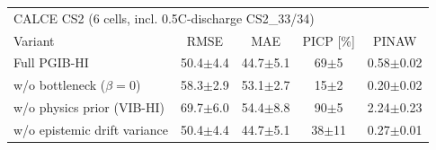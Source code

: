 \begin{tabular}{l c c c c}
\hline
\multicolumn{5}{l}{CALCE CS2 (6 cells, incl. 0.5C-discharge CS2\_33/34)}\\
 Variant & RMSE & MAE & PICP [\%] & PINAW \\
\hline
Full PGIB-HI & 50.4$\pm$4.4 & 44.7$\pm$5.1 & 69$\pm$5 & 0.58$\pm$0.02 \\
w/o bottleneck ($\beta=0$) & 58.3$\pm$2.9 & 53.1$\pm$2.7 & 15$\pm$2 & 0.20$\pm$0.02 \\
w/o physics prior (VIB-HI) & 69.7$\pm$6.0 & 54.4$\pm$8.8 & 90$\pm$5 & 2.24$\pm$0.23 \\
w/o epistemic drift variance & 50.4$\pm$4.4 & 44.7$\pm$5.1 & 38$\pm$11 & 0.27$\pm$0.01 \\
\hline
\end{tabular}
